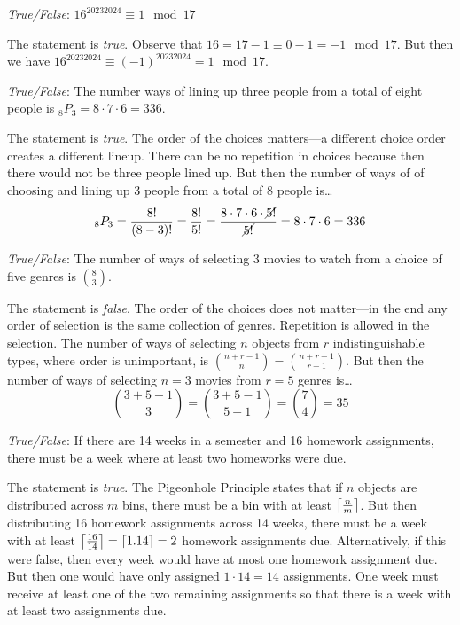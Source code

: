\documentclass[11pt,letterpaper]{article}
\DeclarePairedDelimiter\ceil{\lceil}{\rceil}
\begin{document}
\quizsol \textit{True/False}: $16^{20232024} \equiv 1 \mod 17$ \pspace

\sol The statement is \textit{true}. Observe that $16= 17 - 1 \equiv 0 - 1= -1 \mod 17$. But then we have $16^{20232024} \equiv (-1)^{20232024} = 1 \mod 17$. \pvspace{1.3cm}



\quizsol \textit{True/False}: The number ways of lining up three people from a total of eight people is $_8P_3= 8 \cdot7 \cdot 6= 336$. \pspace

\sol The statement is \textit{true}. The order of the choices matters---a different choice order creates a different lineup. There can be no repetition in choices because then there would not be three people lined up. But then the number of ways of of choosing and lining up 3 people from a total of 8 people is\dots
	\[
	_8P_3= \dfrac{8!}{(8 - 3)!}= \dfrac{8!}{5!}= \dfrac{8 \cdot 7 \cdot 6 \cdot \cancel{5!}}{\cancel{5!}}= 8 \cdot 7 \cdot 6= 336
	\] \pvspace{1.3cm}



\quizsol \textit{True/False}: The number of ways of selecting 3 movies to watch from a choice of five genres is $\binom{8}{3}$. \pspace

\sol The statement is \textit{false}. The order of the choices does not matter---in the end any order of selection is the same collection of genres. Repetition is allowed in the selection. The number of ways of selecting $n$ objects from $r$ indistinguishable types, where order is unimportant, is $\binom{n + r - 1}{n}= \binom{n + r - 1}{r - 1}$. But then the number of ways of selecting $n= 3$ movies from $r= 5$ genres is\dots
	\[
	\binom{3 + 5 - 1}{3}= \binom{3 + 5 - 1}{5 - 1}= \binom{7}{4}= 35
	\] \pvspace{1.3cm}



\quizsol \textit{True/False}: If there are 14 weeks in a semester and 16 homework assignments, there must be a week where at least two homeworks were due. \pspace

\sol The statement is \textit{true}. The Pigeonhole Principle states that if $n$ objects are distributed across $m$ bins, there must be a bin with at least $\ceil*{\frac{n}{m}}$. But then distributing 16 homework assignments across 14 weeks, there must be a week with at least $\ceil*{\frac{16}{14}}= \ceil*{1.14}= 2$ homework assignments due. Alternatively, if this were false, then every week would have at most one homework assignment due. But then one would have only assigned $1 \cdot 14= 14$ assignments. One week must receive at least one of the two remaining assignments so that there is a week with at least two assignments due. \pvspace{1.3cm}
\end{document}
